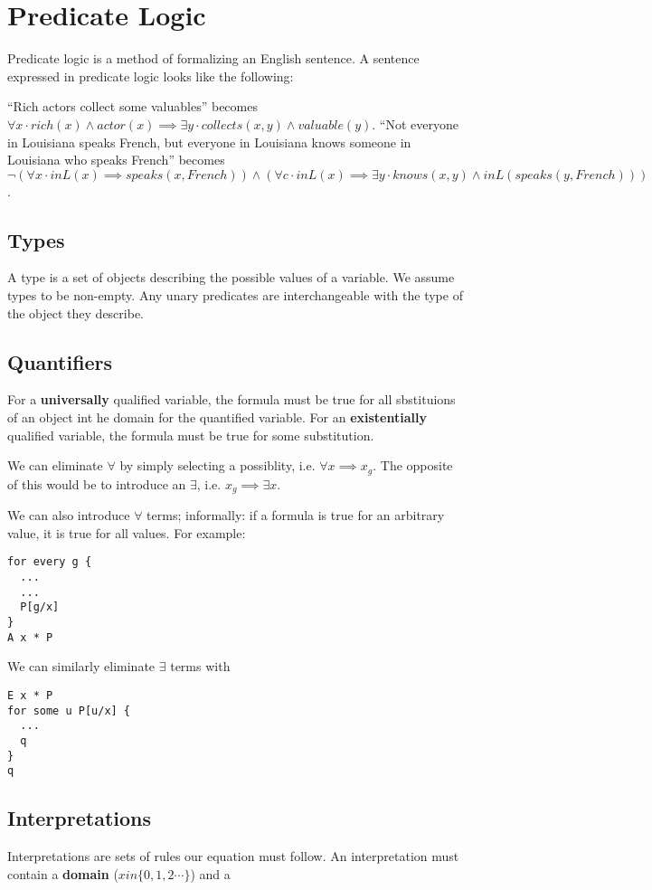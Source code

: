 \documentclass[12pt]{article}
\begin{document}
\section*{Predicate Logic}
Predicate logic is a method of formalizing an English sentence. A sentence expressed in predicate logic looks like the following:

``Rich actors collect some valuables'' becomes $\forall x \cdot rich(x) \land actor(x) \implies \exists y \cdot collects(x,y) \land valuable(y)$. ``Not everyone in Louisiana speaks French, but everyone in Louisiana knows someone in Louisiana who speaks French'' becomes $\neg (\forall x \cdot inL(x) \implies speaks(x, French)) \land (\forall c \cdot inL(x) \implies \exists y \cdot knows(x,y) \land inL(speaks(y, French)))$.

\subsection*{Types}
A type is a set of objects describing the possible values of a variable. We assume types to be non-empty. Any unary predicates are interchangeable with the type of the object they describe.

\subsection*{Quantifiers}
For a {\bf universally} qualified variable, the formula must be true for all sbstituions of an object int he domain for the quantified variable. For an {\bf existentially} qualified variable, the formula must be true for some substitution.

We can eliminate $\forall$ by simply selecting a possiblity, i.e. $\forall x \implies x_g$. The opposite of this would be to introduce an $\exists$, i.e. $x_g \implies \exists x$.

We can also introduce $\forall$ terms; informally: if a formula is true for an arbitrary value, it is true for all values. For example:
\begin{verbatim}
for every g {
  ...
  ...
  P[g/x]
}
A x * P
\end{verbatim}

We can similarly eliminate $\exists$ terms with
\begin{verbatim}
E x * P
for some u P[u/x] {
  ...
  q
}
q
\end{verbatim}

\subsection*{Interpretations}
Interpretations are sets of rules our equation must follow. An interpretation must contain a {\bf domain} ($x in \{0, 1, 2 \cdots\}$) and a
\end{document}

